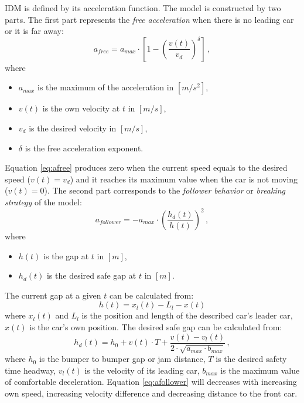 \documentclass[a4paper,11pt,twoside]{report}
\begin{document}
			IDM is defined by its acceleration function. The model is constructed by two parts. The first part represents the \textit{free acceleration} when there is no leading car or it is far away:
			\begin{equation}
			a_{free}=a_{max}\cdot \left [ 1 - \left ( \frac{v(t)}{v_d} \right )^\delta \right ]\,,
			\label{eq:afree}
			\end{equation}
			where
			\begin{itemize}
				\item $a_{max}$ is the maximum of the acceleration in $[m/s^2]$,
				\item $v(t)$ is the own velocity at $t$ in $[m/s]$,
				\item $v_d$ is the desired velocity in $[m/s]$,
				\item $\delta$ is the free acceleration exponent.
			\end{itemize}
			Equation \ref{eq:afree} produces zero when the current speed equals to the desired speed ($v(t)=v_d$) and it reaches its maximum value when the car is not moving ($v(t)=0$).
			The second part corresponds to the \textit{follower behavior} or \textit{breaking strategy} of the model:
			\begin{equation}
			a_{follower}=-a_{max}\cdot \left ( \frac{h_d(t)}{h(t)} \right )^2\,,
			\label{eq:afollower}
			\end{equation}
			where
			\begin{itemize}
				\item $h(t)$ is the gap at $t$ in $[m]$,
				\item $h_d(t)$ is the desired safe gap at $t$ in $[m]$.
			\end{itemize}
			The current gap at a given $t$ can be calculated from:
			$$
				h(t)=x_l(t)-L_l - x(t)
			$$
			where $x_l(t)$ and $L_l$ is the position and length of the described car's leader car, $x(t)$ is the car's own position.
			The desired safe gap can be calculated from:
			$$
				h_d(t)=h_0 + v(t)\cdot T + \frac{v(t)-v_l(t)}{2\cdot \sqrt{a_{max}\cdot b_{max}}}\,,
			$$
			where $h_0$ is the bumper to bumper gap or jam distance, $T$ is the desired safety time headway, $v_l(t)$ is the velocity of its leading car, $b_{max}$ is the maximum value of comfortable deceleration.
			Equation \ref{eq:afollower} will decreases with increasing own speed, increasing velocity difference and decreasing distance to the front car.
\end{document}
